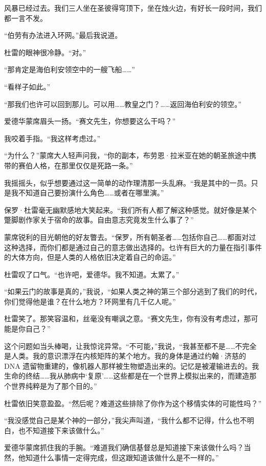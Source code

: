\documentclass[AutoFakeBold=true]{book}
\begin{document}
\vspace*{1em}

风暴已经过去。我们三人坐在圣彼得穹顶下，坐在烛火边，有好长一段时间，我们都一言不发。

``伯劳有办法进入环网。''最后我说道。

杜雷的眼神很冷静。``对。''

``那肯定是海伯利安领空中的一艘飞船……''

``看样子如此。''

``那我们也许可以回到那儿。可以用……教皇之门？……返回海伯利安的领空。''

爱德华蒙席眉头一扬。``赛文先生，你想要这么干吗？''

我咬着手指。``我这样考虑过。''

``为什么？''蒙席大人轻声问我，``你的副本，布劳恩·拉米亚在她的朝圣旅途中携带的赛伯人格，在那里仅仅是死路一条。''

我摇摇头，似乎想要通过这一简单的动作理清那一头乱麻。``我是其中的一员。只是我不知道自己要扮演什么角色……或者在哪里演。''

保罗·杜雷毫无幽默感地大笑起来。``我们所有人都了解这种感觉。就好像是某个蹩脚剧作家关于宿命的故事。自由意志究竟发生什么事了？''

蒙席锐利的目光朝他的好友瞥去。``保罗，所有朝圣者……包括你自己……都面对过这种选择，而你们都是通过自己的意志做出选择的。乜许有巨大的力量在指引事件的大体方向，但是人类的人格依旧决定着自己的命运。''

杜雷叹了口气。``也许吧，爱德华。我不知道。太累了。''

``如果云门的故事是真的，''我说，``如果人类之神的第三个部分逃到了我们的时代，你们觉得他是谁？在什么地方？环网里有几千亿人呢。''

杜雷笑了。那笑容温和，丝毫没有嘲讽之意。``赛文先生，你有没有考虑过，那可能是你自己？''

这个问题如当头棒喝，让我惊诧异常。``不可能，''我说，``我甚至都不是……不完全是人类。我的意识漂浮在内核矩阵的某个地方。我的身体是通过约翰·济慈的 DNA 遗留物重建的，像机器人那样被生物塑造出来的。记忆是被灌输进去的。我生命的终结……我从肺病中`复原'……这些都是在一个世界上模拟出来的，而建造那个世界纯粹是为了那个目的。''

杜雷依旧笑意盈盈。``然后呢？难道这些排除了你作为这个移情实体的可能性吗？''

``我没感觉自己是某个神的一部分，''我尖声叫道，``我什么都不记得，什么也不明白，也不知道接下来该做什么。''

爱德华蒙席抓住我的手腕。``难道我们确信基督总是知道接下来该做什么吗？当然，他知道什么事情一定得完成，但这跟知道该做什么是不一样的。''
\end{document}
